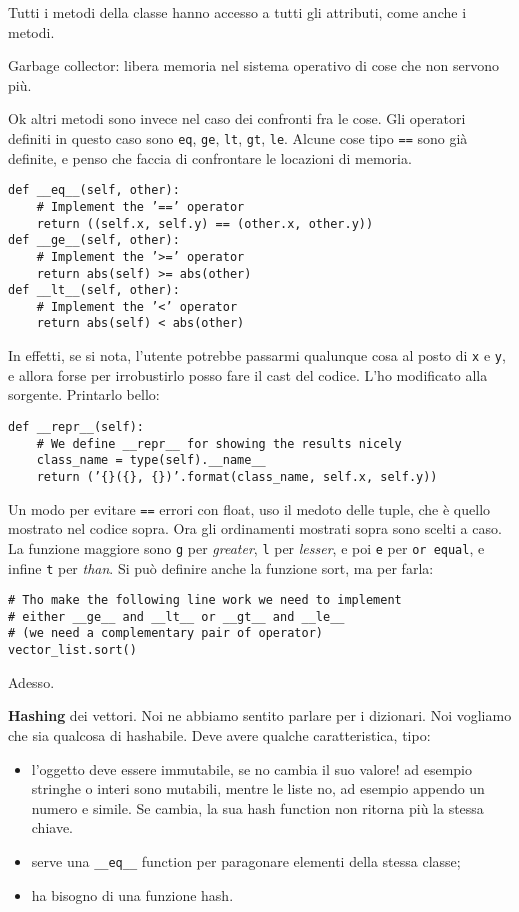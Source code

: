 \documentclass[10pt, a4paper, titlepage]{book}
\begin{document}
Tutti i metodi della classe hanno accesso a tutti gli attributi, come anche i metodi.

Garbage collector: libera memoria nel sistema operativo di cose che non servono più.

Ok altri metodi sono invece nel caso dei confronti fra le cose.
Gli operatori definiti in questo caso sono \texttt{eq}, \texttt{ge}, \texttt{lt}, \texttt{gt}, \texttt{le}. Alcune cose tipo \texttt{==} sono già definite, e penso che faccia di confrontare le locazioni di memoria.
\begin{verbatim}
def __eq__(self, other):
	# Implement the ’==’ operator
	return ((self.x, self.y) == (other.x, other.y))
def __ge__(self, other):
	# Implement the ’>=’ operator
	return abs(self) >= abs(other)
def __lt__(self, other):
	# Implement the ’<’ operator
	return abs(self) < abs(other)
\end{verbatim}

In effetti, se si nota, l'utente potrebbe passarmi qualunque cosa al posto di \texttt{x} e \texttt{y}, e allora forse per irrobustirlo posso fare il cast del codice. L'ho modificato alla sorgente.
Printarlo bello:
\begin{verbatim}
def __repr__(self):
	# We define __repr__ for showing the results nicely
	class_name = type(self).__name__
	return (’{}({}, {})’.format(class_name, self.x, self.y))	
\end{verbatim}

Un modo per evitare \texttt{==} errori con float, uso il medoto delle tuple, che è quello mostrato nel codice sopra.
Ora gli ordinamenti mostrati sopra sono scelti a caso.
La funzione maggiore sono \texttt{g} per \textit{greater}, \texttt{l} per \textit{lesser}, e poi \texttt{e} per \texttt{or equal}, e infine \texttt{t} per \textit{than}.
Si può definire anche la funzione sort, ma per farla:
\begin{verbatim}
# Tho make the following line work we need to implement
# either __ge__ and __lt__ or __gt__ and __le__ 
# (we need a complementary pair of operator)
vector_list.sort()
\end{verbatim}

Adesso.

\textbf{Hashing} dei vettori. Noi ne abbiamo sentito parlare per i dizionari. Noi vogliamo che sia qualcosa di hashabile.
Deve avere qualche caratteristica, tipo:
\begin{itemize}
	\item l'oggetto deve essere immutabile, se no cambia il suo valore! ad esempio stringhe o interi sono mutabili, mentre le liste no, ad esempio appendo un numero e simile. Se cambia, la sua hash function non ritorna più la stessa chiave.
	\item serve una \texttt{__eq__} function per paragonare elementi della stessa classe;
	\item ha bisogno di una funzione hash.
\end{itemize}
\end{document}
